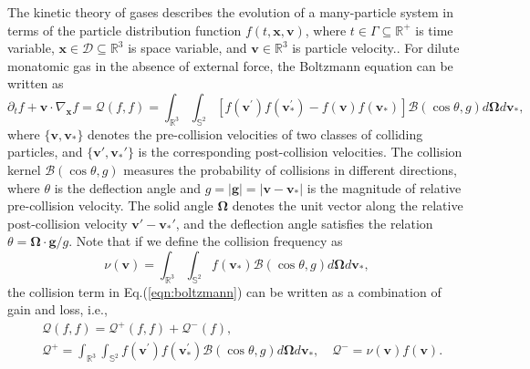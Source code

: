 \documentclass[preprint,3p,12pt,sort&compress]{elsarticle}
\begin{document}
The kinetic theory of gases describes the evolution of a many-particle system in terms of the particle distribution function $f(t,\mathbf x,\mathbf v)$, where $t\in \Gamma \subseteq \mathbb R^+$ is time variable, $\mathbf x \in \mathcal D \subseteq \mathbb R^3$ is space variable, and $\mathbf v \in \mathbb R^3$ is particle velocity..
For dilute monatomic gas in the absence of external force, the Boltzmann equation can be written as
\begin{equation}
    \partial_t f + \mathbf v \cdot \nabla_\mathbf x f = \mathcal Q(f,f) = \int_{\mathbb{R}^{3}} \int_{\mathbb S^{2}}\left[f\left(\mathbf{v}^{\prime}\right) f\left(\mathbf{v}_{*}^{\prime}\right)-f(\mathbf{v}) f\left(\mathbf{v}_{*}\right)\right] \mathcal{B}(\cos \theta, g) d \mathbf \Omega d \mathbf{v}_{*},
\label{eqn:boltzmann}
\end{equation}
where $\{\mathbf v, \mathbf v_*\}$ denotes the pre-collision velocities of two classes of colliding particles, and $\{\mathbf v', \mathbf v_*'\}$ is the corresponding post-collision velocities.
The collision kernel $\mathcal{B}(\cos \theta, g)$ measures the probability of collisions in different directions, where $\theta$ is the deflection angle and $g = |\mathbf g| = |\mathbf v - \mathbf v_*|$ is the magnitude of relative pre-collision velocity.
The solid angle $\mathbf \Omega$ denotes the unit vector along the relative post-collision velocity $\mathbf v' - \mathbf v_*'$, and the deflection angle satisfies the relation $\theta=\mathbf \Omega \cdot \mathbf g / g$.
Note that if we define the collision frequency as
\begin{equation}
    \nu(\mathbf v)=\int_{\mathbb{R}^{3}} \int_{\mathbb{S}^{2}} f\left(\mathbf v_{*} \right) \mathcal B\left(\cos \theta,g\right) d \mathbf \Omega d \mathbf v_{*},
    \label{eqn:collision frequency}
\end{equation}
the collision term in Eq.(\ref{eqn:boltzmann}) can be written as a combination of gain and loss, i.e.,
\begin{equation}
\begin{aligned}
    &\mathcal Q(f,f) = \mathcal Q^+(f,f) + \mathcal Q^-(f), \\
    &\mathcal Q^+ = \int_{\mathbb{R}^{3}} \int_{\mathbb S^{2}} f\left(\mathbf{v}^{\prime}\right) f\left(\mathbf{v}_{*}^{\prime}\right) \mathcal{B}(\cos \theta, g) d \mathbf \Omega d \mathbf{v}_{*}, \quad
    \mathcal Q^- = \nu(\mathbf v) f(\mathbf v).
\end{aligned}
\label{eqn:boltzmann gainloss}
\end{equation}
\end{document}
